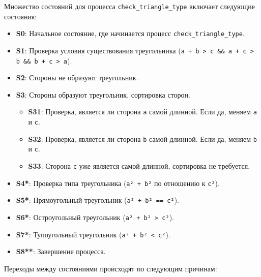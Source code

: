 \documentclass{bmstu}
\begin{document}
Множество состояний для процесса \texttt{check\_triangle\_type} включает следующие состояния:

\begin{itemize}
  \item \textbf{S0}: Начальное состояние, где начинается процесс \texttt{check\_triangle\_type}.
  \item \textbf{S1}: Проверка условия существования треугольника (\texttt{a + b > c \&\& a + c > b \&\& b + c > a}).
  \item \textbf{S2}: Стороны не образуют треугольник.
  \item \textbf{S3}: Стороны образуют треугольник, сортировка сторон.
  \begin{itemize}
    \item \textbf{S31}: Проверка, является ли сторона \texttt{a} самой длинной. Если да, меняем \texttt{a} и \texttt{c}.
    \item \textbf{S32}: Проверка, является ли сторона \texttt{b} самой длинной. Если да, меняем \texttt{b} и \texttt{c}.
    \item \textbf{S33}: Сторона \texttt{c} уже является самой длинной, сортировка не требуется.
  \end{itemize}
  \item \textbf{S4*}: Проверка типа треугольника (\texttt{a² + b²} по отношению к \texttt{c²}).
  \item \textbf{S5*}: Прямоугольный треугольник (\texttt{a² + b² == c²}).
  \item \textbf{S6*}: Остроугольный треугольник (\texttt{a² + b² > c²}).
  \item \textbf{S7*}: Тупоугольный треугольник (\texttt{a² + b² < c²}).
  \item \textbf{S8**}: Завершение процесса.
\end{itemize}

Переходы между состояниями происходят по следующим причинам:
\end{document}
